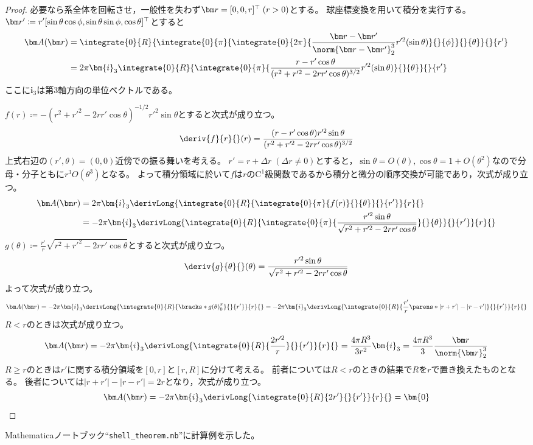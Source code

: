             \begin{proof}
                必要なら系全体を回転させ，一般性を失わず$\vr = [0,0,r]^\top\;(r>0)$とする。
                球座標変換を用いて積分を実行する。
                $\vr' \coloneq r'[\sin\theta\cos\phi,\sin\theta\sin\phi,\cos\theta]^\top$とすると
                \begin{align*}
                    \vA(\vr) &= \integrate{0}{R}{\integrate{0}{\pi}{\integrate{0}{2\pi}{\frac{\vr-\vr'}{\norm{\vr-\vr'}_2^3}r'^2(\sin\theta)}{}{\phi}}{}{\theta}}{}{r'} \\
                    &= 2\pi\bm{i}_3\integrate{0}{R}{\integrate{0}{\pi}{\frac{r-r'\cos\theta}{(r^2+r'^2-2rr'\cos\theta)^{3/2}}r'^2(\sin\theta)}{}{\theta}}{}{r'}
                \end{align*}
                ここに$\bm{i}_3$は第3軸方向の単位ベクトルである。
                \par
                $f(r) \coloneq -(r^2+r'^2-2rr'\cos\theta)^{-1/2}r'^2\sin\theta$とすると次式が成り立つ。
                \[ \deriv{f}{r}{}(r) = \frac{(r-r'\cos\theta)r'^2\sin\theta}{(r^2+r'^2-2rr'\cos\theta)^{3/2}} \]
                上式右辺の$(r',\theta)=(0,0)$近傍での振る舞いを考える。
                $r'=r+\Delta r\;(\Delta r\neq 0)$とすると，$\sin\theta = O(\theta),\cos\theta = 1+O(\theta^2)$なので分母・分子ともに$r^3 O(\theta^3)$となる。
                よって積分領域に於いて$f$は$r$の$\mathrm{C}^1$級関数であるから積分と微分の順序交換が可能であり，次式が成り立つ。
                \begin{align*}
                    \vA(\vr) &= 2\pi\bm{i}_3\derivLong{\integrate{0}{R}{\integrate{0}{\pi}{f(r)}{}{\theta}}{}{r'}}{r}{} \\
                    &= -2\pi\bm{i}_3\derivLong{\integrate{0}{R}{\integrate{0}{\pi}{\frac{r'^2\sin\theta}{\sqrt{r^2+r'^2-2rr'\cos\theta}}}{}{\theta}}{}{r'}}{r}{}
                \end{align*}
                $g(\theta) \coloneq \frac{r'}{r}\sqrt{r^2+r'^2-2rr'\cos\theta}$とすると次式が成り立つ。
                \[ \deriv{g}{\theta}{}(\theta) = \frac{r'^2\sin\theta}{\sqrt{r^2+r'^2-2rr'\cos\theta}} \]
                よって次式が成り立つ。
                \[ \vA(\vr) = -2\pi\bm{i}_3\derivLong{\integrate{0}{R}{\bracks*{g(\theta)}_0^\pi}{}{r'}}{r}{} = -2\pi\bm{i}_3\derivLong{\integrate{0}{R}{\frac{r'}{r}\parens*{|r+r'|-|r-r'|}}{}{r'}}{r}{} \]
                $R<r$のときは次式が成り立つ。
                \[ \vA(\vr) = -2\pi\bm{i}_3\derivLong{\integrate{0}{R}{\frac{2r'^2}{r}}{}{r'}}{r}{} = \frac{4\pi R^3}{3r^2}\bm{i}_3 = \frac{4\pi R^3}{3}\frac{\vr}{\norm{\vr}_2^3} \]
                $R\geq r$のときは$r'$に関する積分領域を$[0,r]$と$[r,R]$に分けて考える。
                前者については$R<r$のときの結果で$R$を$r$で置き換えたものとなる。
                後者については$|r+r'|-|r-r'| = 2r$となり，次式が成り立つ。
                \[ \vA(\vr) = -2\pi\bm{i}_3\derivLong{\integrate{0}{R}{2r'}{}{r'}}{r}{} = \bm{0} \]
            \end{proof}
            Mathematicaノートブック``\nolinkurl{shell_theorem.nb}''に計算例を示した。

